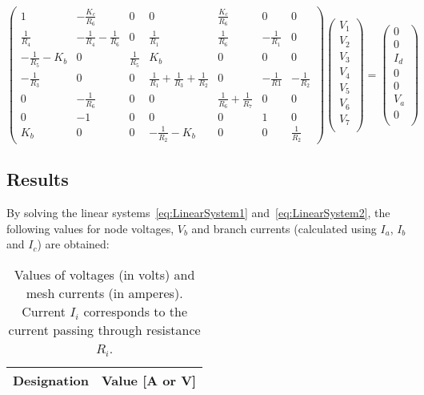 \begin{equation}
  \begin{pmatrix}
    1 & -\frac{K_c}{R_6} & 0 & 0 & \frac{K_c}{R_6} & 0 & 0 \\
    \frac{1}{R_4} & -\frac{1}{R_4}-\frac{1}{R_6} & 0 & \frac{1}{R_1} & \frac{1}{R_6} & -\frac{1}{R_1} & 0 \\
    -\frac{1}{R_5}-K_b & 0 & \frac{1}{R_5} & K_b & 0 & 0 & 0 \\
    -\frac{1}{R_3} & 0 & 0 & \frac{1}{R_1}+\frac{1}{R_3}+\frac{1}{R_2} & 0 & -\frac{1}{R1} & -\frac{1}{R_2} \\
    0 & -\frac{1}{R_6} & 0 & 0 & \frac{1}{R_6}+\frac{1}{R_7} & 0 & 0 \\
    0 & -1 & 0 & 0 & 0 & 1 & 0 \\
    K_b & 0 & 0 & -\frac{1}{R_2}-K_b & 0 & 0 & \frac{1}{R_2}
  \end{pmatrix}
  \begin{pmatrix}
    V_1  \\
    V_2  \\
    V_3  \\
    V_4  \\
    V_5  \\
    V_6  \\
    V_7  \\
  \end{pmatrix}
  =
  \begin{pmatrix}
    0   \\
    0   \\
    I_d \\
    0   \\
    0   \\
    V_a \\
    0   \\
  \end{pmatrix}
  \label{eq:LinearSystem2}
\end{equation}


\subsection{Results}
By solving the linear systems~\ref{eq:LinearSystem1} and~\ref{eq:LinearSystem2}, the following values for node voltages, $V_b$ and branch currents (calculated using $I_a$, $I_b$ and $I_c$) are obtained:

\begin{table}[H]
  \centering
  \begin{tabular}{|c|c|}
    \hline
        {\bf Designation} & {\bf Value [A or V]} \\ \hline
        
  \end{tabular}
  \caption{Values of voltages (in volts) and mesh currents (in amperes). Current $I_i$ corresponds to the current passing through resistance $R_i$.}
  \label{tab:Theoretical}
\end{table}



